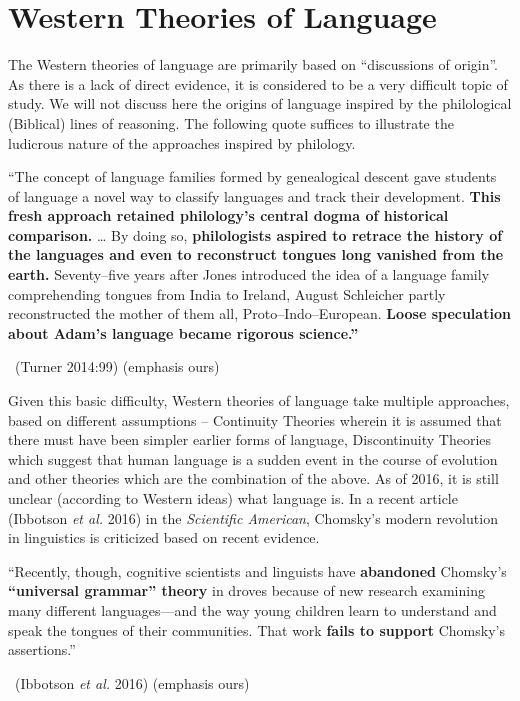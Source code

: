 \section*{Western Theories of Language}

\vskip -6pt

The Western theories of language are primarily based on “discussions of origin”. As there is a lack of direct evidence, it is considered to be a very difficult topic of study. We will not discuss here the origins of language inspired by the philological (Biblical) lines of reasoning. The following quote suffices to illustrate the ludicrous nature of the approaches inspired by philology.

\begin{myquote}
“The concept of language families formed by genealogical descent gave students of language a novel way to classify languages and track their development. \textbf{This fresh approach retained philology’s central dogma of historical comparison.} … By doing so, \textbf{philologists aspired to retrace the history of the languages and even to reconstruct tongues long vanished from the earth.} Seventy–five years after Jones introduced the idea of a language family comprehending tongues from India to Ireland, August Schleicher partly reconstructed the mother of them all, Proto–Indo–European. \textbf{Loose speculation about Adam’s language became rigorous science.”}

~\hfill (Turner 2014:99) (emphasis ours)
\end{myquote}

Given this basic difficulty, Western theories of language take multiple approaches, based on different assumptions – Continuity Theories wherein it is assumed that there must have been simpler earlier forms of language, Discontinuity Theories which suggest that human language is a sudden event in the course of evolution and other theories which are the combination of the above. As of 2016, it is still unclear (according to Western ideas) what language is. In a recent article (Ibbotson \textit{et al.} 2016) in the \textit{Scientific American}, Chomsky’s modern revolution in linguistics is criticized based on recent evidence.

\begin{myquote}
“Recently, though, cognitive scientists and linguists have \textbf{abandoned } Chomsky’s \textbf{“universal grammar” theory} in droves because of new research examining many different languages—and the way young children learn to understand and speak the tongues of their communities. That work \textbf{fails to support} Chomsky’s assertions.”

~\hfill (Ibbotson \textit{et al.} 2016) (emphasis ours)
\end{myquote}

